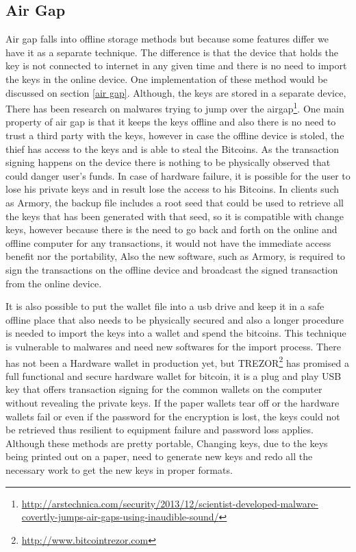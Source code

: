 \subsection{Air Gap}

Air gap falls into offline storage methods but because some features differ we have it as a separate technique. The difference is that the device that holds the key is not connected to internet in any given time and there is no need to import the keys in the online device. One implementation of these method would be discussed on section \ref{air gap}. 
Although, the keys are stored in a separate device, There has been research on malwares trying to jump over the airgap\footnote{\url{http://arstechnica.com/security/2013/12/scientist-developed-malware-covertly-jumps-air-gaps-using-inaudible-sound/}}. One main property of air gap is that it keeps the keys offline and also there is no need to trust a third party with the keys, however in case the offline device is stoled, the thief has access to the keys and is able to steal the Bitcoins. %
As the transaction signing happens on the device there is nothing to be physically observed that could danger user's funds. In case of hardware failure, it is possible for the user to lose his private keys and in result lose the access to his Bitcoins. %
In clients such as Armory, the backup file includes a root seed that could be used to retrieve all the keys that has been generated with that seed, so it is compatible with change keys, however because there is the need to go back and forth on the online and offline computer for any transactions, it would not have the immediate access benefit nor the portability, Also the new software, such as Armory, is required to sign the transactions on the offline device and broadcast the signed transaction from the online device.


It is also possible to put the wallet file into a usb drive and keep it in a safe offline place that also needs to be physically secured and also a longer procedure is needed to import the keys into a wallet and spend the bitcoins. This technique is vulnerable to malwares and need new softwares for the import process. There has not been a Hardware wallet in production yet, but TREZOR\footnote{\url {http://www.bitcointrezor.com}} has promised a full functional and secure hardware wallet for bitcoin, it is a plug and play USB key that offers transaction signing for the common wallets on the computer without revealing the private keys. If the paper wallets tear off or the hardware wallets fail or even if the password for the encryption is lost, the keys could not be retrieved thus resilient to equipment failure and password loss applies. Although these methods are pretty portable, Changing keys, due to the keys being printed out on a paper, need to generate new keys and redo all the necessary work to get the new keys in proper formats.



